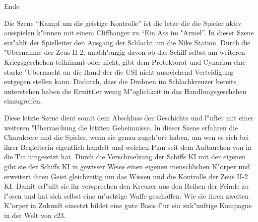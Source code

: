 \begin{remarks}
	\begin{center}\huge{}Ende\end{center}

	Die Szene "`Kampf um die geistige Kontrolle"' ist die letze die die Spieler aktiv ausspielen k"onnen mit einem Cliffhanger zu "`Ein Ass im "Armel"'. In dieser Szene erz"ahlt der Spielleiter den Ausgang der Schlacht um die Nike Station. Durch die "Ubernahme der Zeus II-2, unabh"angig davon ob das Schiff selbst am weiteren Kriegsgeschehen teilnimmt oder nicht, gibt dem Protektorat und Cynarian eine starke "Ubermacht an die Hand der die USI nicht ausreichend Verteidigung entgegen stellen kann. Dadurch, dass die Drohnen im Schlachkreuzer bereits \xl{} unterstehen haben die Ermittler wenig M"oglichkeit in das Handlungsgeschehen einzugreifen.

	Diese letzte Szene dient somit dem Abschluss der Geschichte und l"uftet mit einer weiteren "Uberraschung die letzten Geheimnisse. In dieser Szene erfahren die Charaktere und die Spieler, wenn sie genau zugeh"ort haben, um wen es sich bei ihrer Begleiterin eigentlich handelt und welchen Plan \xl{} seit dem Auftauchen von \ml{} in die Tat umgesetzt hat. Durch die Verschmelzung der Schiffs KI mit der eigenen gibt sie der Schiffs KI in gewisser Weise einen eigenen menschlichen K"orper und erweitert ihren Geist gleichzeitig um das Wissen und die Kontrolle der Zeus II-2 KI. Damit erf"ullt sie ihr versprechen den Kreuzer aus den Reihen der Feinde zu l"osen und hat sich selbst eine m"achtige Waffe geschaffen. Wie sie ihren zweiten K"orper in Zukunft einsetzt bildet eine gute Basis f"ur ein zuk"unftige Kompagne in der Welt von c23.
\end{remarks}